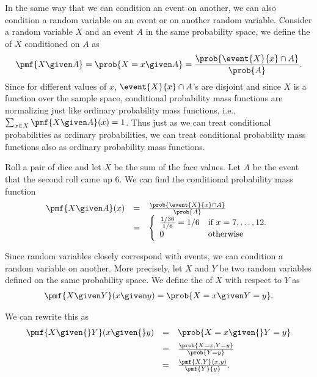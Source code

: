 \begin{flex}
\begin{gram}
In the same way that we can condition an event on another, we can also
condition a random variable on an event or on another random variable.
%
Consider a random variable $X$ and an event $A$ in the same probability
space, we define the  of
$X$ conditioned on  $A$ as 
\[
\pmf{X \given A} = \prob{X = x \given A} = \frac{\prob{\event{X}{x} \cap A}}{\prob{A}}.
\]
%
Since for different values of $x$, $\event{X}{x} \cap A$'s are
disjoint and since $X$ is a function over the sample space,
conditional probability mass functions are normalizing just like
ordinary probability mass functions, i.e., $\sum_{x \in X}{\pmf{X \given A}(x)} = 1$.
%
Thus just as we can treat conditional probabilities as ordinary
probabilities, we can treat conditional probability  mass functions
also as ordinary probability mass functions.
\end{gram}


\begin{example}
Roll a pair of dice and let $X$ be the sum of the face values.  Let
$A$ be the event that the second roll came up $6$.
%
We can find the conditional probability mass function 
\[
\begin{array}{lll}
\pmf{X \given A}(x) & = & \frac{\prob{\event{X}{x} \cap A}}{\prob{A}}
\\
& = & 
\left\{
\begin{array}{ll}
\frac{1/36}{1/6} = 1/6 & \mbox{if}~x = 7,  \ldots, 12.
\\
0 & \mbox{otherwise}
\end{array}
\right.
\end{array}
\]
 
\end{example}
\end{flex}

\begin{gram}
Since random variables closely correspond with events, we can
condition a random variable on another.
%
More precisely, let $X$ and $Y$ be two random variables defined on the
same probability space.
%
We define the  of $X$ with
respect to $Y$ as 
\[
\begin{array}{l}
\pmf{X \given Y}(x \given y) = \prob{X = x \given Y = y}.
\end{array}
\] 

We can rewrite this as 
\[
\begin{array}{lll}
\pmf{X \given{} Y}(x \given{} y) 
& = & \prob{X = x \given{} Y = y}
\\[2mm]
& = & \frac{\prob{X = x, Y = y}}{\prob{Y = y}}
\\[2mm]
& = & \frac{\pmf{X,Y}(x,y)}{\pmf{Y}{y}}.
\end{array}
\] 
\end{gram}

